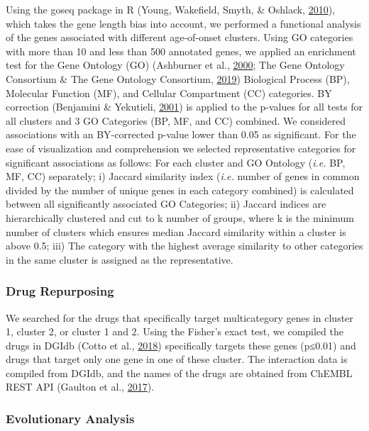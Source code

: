 \documentclass[12pt,twoside]{unicam}
\begin{document}
Using the goseq package in R (Young, Wakefield, Smyth, \& Oshlack, \protect\hyperlink{ref-Young2010}{2010}), which takes the gene length bias into account, we performed a functional analysis of the genes associated with different age-of-onset clusters. Using GO categories with more than 10 and less than 500 annotated genes, we applied an enrichment test for the Gene Ontology (GO) (Ashburner et al., \protect\hyperlink{ref-Ashburner2000}{2000}; The Gene Ontology Consortium \& The Gene Ontology Consortium, \protect\hyperlink{ref-The_Gene_Ontology_Consortium2019}{2019}) Biological Process (BP), Molecular Function (MF), and Cellular Compartment (CC) categories. BY correction (Benjamini \& Yekutieli, \protect\hyperlink{ref-Benjamini2001}{2001}) is applied to the p-values for all tests for all clusters and 3 GO Categories (BP, MF, and CC) combined. We considered associations with an BY-corrected p-value lower than 0.05 as significant. For the ease of visualization and comprehension we selected representative categories for significant associations as follows: For each cluster and GO Ontology (\emph{i.e.} BP, MF, CC) separately; i) Jaccard similarity index (\emph{i.e.} number of genes in common divided by the number of unique genes in each category combined) is calculated between all significantly associated GO Categories; ii) Jaccard indices are hierarchically clustered and cut to k number of groups, where k is the minimum number of clusters which ensures median Jaccard similarity within a cluster is above 0.5; iii) The category with the highest average similarity to other categories in the same cluster is assigned as the representative.

\hypertarget{drug-repurposing}{%
\subsubsection{Drug Repurposing}\label{drug-repurposing}}

We searched for the drugs that specifically target multicategory genes in cluster 1, cluster 2, or cluster 1 and 2. Using the Fisher's exact test, we compiled the drugs in DGIdb (Cotto et al., \protect\hyperlink{ref-Cotto2018}{2018}) specifically targets these genes (p≤0.01) and drugs that target only one gene in one of these cluster. The interaction data is compiled from DGIdb, and the names of the drugs are obtained from ChEMBL REST API (Gaulton et al., \protect\hyperlink{ref-Gaulton2017}{2017}).

\hypertarget{evolutionary-analysis}{%
\subsubsection{Evolutionary Analysis}\label{evolutionary-analysis}}
\end{document}
